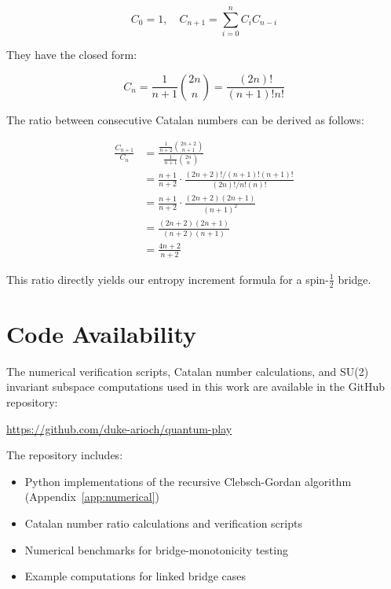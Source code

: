 \documentclass[11pt, a4paper]{article}
\theoremstyle{plain}
\theoremstyle{definition}
\theoremstyle{remark}
\begin{document}
\begin{equation}
  C_0 = 1, \quad C_{n+1} = \sum_{i=0}^{n} C_i C_{n-i}
\end{equation}

They have the closed form:

\begin{equation}
  C_n = \frac{1}{n+1}\binom{2n}{n} = \frac{(2n)!}{(n+1)!n!}
\end{equation}

The ratio between consecutive Catalan numbers can be derived as follows:

\begin{align}
  \frac{C_{n+1}}{C_n} &= \frac{\frac{1}{n+2}\binom{2n+2}{n+1}}{\frac{1}{n+1}\binom{2n}{n}} \\
  &= \frac{n+1}{n+2} \cdot \frac{(2n+2)!/(n+1)!(n+1)!}{(2n)!/n!(n)!} \\
  &= \frac{n+1}{n+2} \cdot \frac{(2n+2)(2n+1)}{(n+1)^2} \\
  &= \frac{(2n+2)(2n+1)}{(n+2)(n+1)} \\
  &= \frac{4n+2}{n+2}
\end{align}

This ratio directly yields our entropy increment formula for a spin-$\frac{1}{2}$ bridge.

\section{Code Availability}
\label{sec:code}

The numerical verification scripts, Catalan number calculations, and SU(2) invariant subspace computations used in this work are available in the GitHub repository:

\begin{center}
  \url{https://github.com/duke-arioch/quantum-play}
\end{center}

The repository includes:
\begin{itemize}
  \item Python implementations of the recursive Clebsch-Gordan algorithm (Appendix~\ref{app:numerical})
  \item Catalan number ratio calculations and verification scripts
  \item Numerical benchmarks for bridge-monotonicity testing
  \item Example computations for linked bridge cases
\end{itemize}
\end{document}
